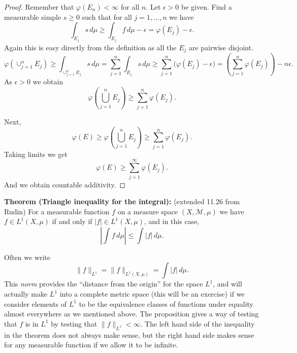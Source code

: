 \documentclass[12pt]{book}
\newcommand{\snorm}[1]{\lVert {#1} \rVert}
\newcommand{\abs}[1]{\left\lvert {#1} \right\rvert}
\newcommand{\sM}{{\mathcal{M}}}
\theoremstyle{plain}
\theoremstyle{remark}
\theoremstyle{definition}
\theoremstyle{exercise}
\theoremstyle{example}
\begin{document}
\begin{proof}
Remember that
$\varphi(E_n) < \infty$ for all $n$.  Let $\epsilon > 0$ be
given.  Find a measurable simple $s \geq 0$ such that for all $j=1,\ldots,n$ we have
$$
\int_{E_j} s \, d\mu
\geq
\int_{E_j} f \, d\mu - \epsilon
=
\varphi(E_j) - \epsilon .
$$
Again this is easy directly from the definition as all the $E_j$ are pairwise
disjoint.
$$
\varphi(\cup_{j=1}^n E_j) \geq
\int_{\cup_{j=1}^n E_j} s \, d\mu
=
\sum_{j=1}^n
\int_{E_j} s \, d\mu
\geq
\sum_{j=1}^n
\bigl( \varphi(E_j) - \epsilon \bigr)
=
\left(\sum_{j=1}^n
\varphi(E_j) \right)  - n\epsilon.
$$
As $\epsilon > 0$ we obtain 
$$
\varphi\left(\bigcup_{j=1}^n E_j\right) \geq
\sum_{j=1}^n
\varphi(E_j) .
$$

Next,
$$
\varphi(E) \geq 
\varphi\left(\bigcup_{j=1}^n E_j\right) \geq
\sum_{j=1}^n
\varphi(E_j) .
$$
Taking limits we get
$$
\varphi(E) \geq 
\sum_{j=1}^\infty
\varphi(E_j) .
$$
And we obtain countable additivity.
\end{proof}

\medskip

\textbf{Theorem (Triangle inequality for the integral):} (extended 11.26 from Rudin)
For a measurable function $f$ on a measure space $(X,\sM,\mu)$ we have
$f \in L^1(X,\mu)$ if and only if $\abs{f} \in L^1(X,\mu)$, and
in this case,
$$
\abs{\int f \, d\mu} \leq
\int \abs{f} \, d\mu.
$$

\medskip

Often we write
$$
\snorm{f}_{L^1} = \snorm{f}_{L^1(X,\mu)} = \int \abs{f} \, d\mu .
$$
This \emph{norm} provides the ``distance from the origin'' for the space
$L^1$, and will actually make $L^1$ into a complete metric space
(this will be an exercise) if we consider elements of $L^1$ to be the
equivalence classes of functions under equality almost everywhere as we
mentioned above.  The proposition gives a way of testing that $f$ is in
$L^1$ by testing that $\snorm{f}_{L^1} < \infty$.  The left hand side
of the inequality in the theorem does not always make sense, but
the right hand side makes sense for any measurable function if we allow it
to be infinite.

\medskip
\end{document}
